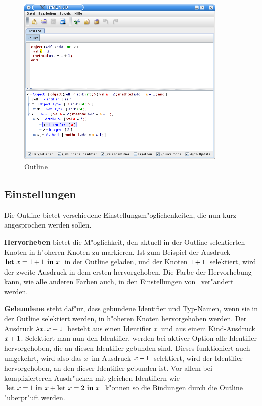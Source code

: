 \begin{figure}[h]
\begin{center}
\includegraphics[width=10cm]{images/outline.png}
\caption{Outline}
\end{center}
\end{figure}

\subsection {Einstellungen}
Die Outline bietet verschiedene Einstellungsm"oglichenkeiten, die nun
kurz angesprochen werden sollen.

{\bf Hervorheben} bietet die M"oglichkeit, den aktuell in der Outline
selektierten Knoten in h"oheren Knoten zu markieren. Ist zum Beispiel
der Ausdruck \glqq$\bli{x}{\infix{+}{1}{1}}{x}$\grqq\ in der Outline geladen,
und der Knoten \glqq${\infix{+}{1}{1}}$\grqq\ selektiert, wird der zweite Ausdruck
in dem ersten hervorgehoben. Die Farbe der Hervorhebung kann, wie alle
anderen Farben auch, in den Einstellungen von \TPML\ ver"andert werden.

{\bf Gebundene} steht daf"ur, dass gebundene Identifier und Typ-Namen,
wenn sie in der Outline selektiert werden, in h"oheren Knoten 
hervorgehoben werden. Der Ausdruck \glqq$\abstr{x}{\infix{+}{x}{1}}$\grqq\ besteht
aus einen Identifier \glqq$x$\grqq\ und aus einem Kind-Ausdruck
\glqq$\infix{+}{x}{1}$\grqq. Selektiert man nun den Identifier, werden bei
aktiver Option alle Identifier hervorgehoben, die an diesen Identifier
gebunden sind. Dieses funktioniert auch umgekehrt, wird also das
\glqq$x$\grqq\ im Ausdruck \glqq$\infix{+}{x}{1}$\grqq\ selektiert, wird der
Identifier hervorgehoben, an den dieser Identifier gebunden ist. Vor allem
bei komplizierteren Ausdr"ucken mit gleichen Identifiern wie 
\glqq$\bli{x}{1}{\infix{+}{x}{\bli{x}{2}{x}}}$\grqq\ k"onnen so die Bindungen
durch die Outline "uberpr"uft werden.

